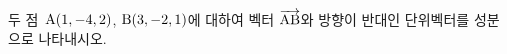 두 점~$\mathrm{A}(1{,}\mkern3mu\mathopen{}-4{,}\mkern3mu\mathopen{}2)$, $\mathrm{B}(3{,}\mkern3mu\mathopen{}-2{,}\mkern3mu\mathopen{}1)$에 대하여 벡터 $\overrightarrow{\mathrm{AB}}$와 방향이 반대인 단위벡터를 성분으로 나타내시오.
